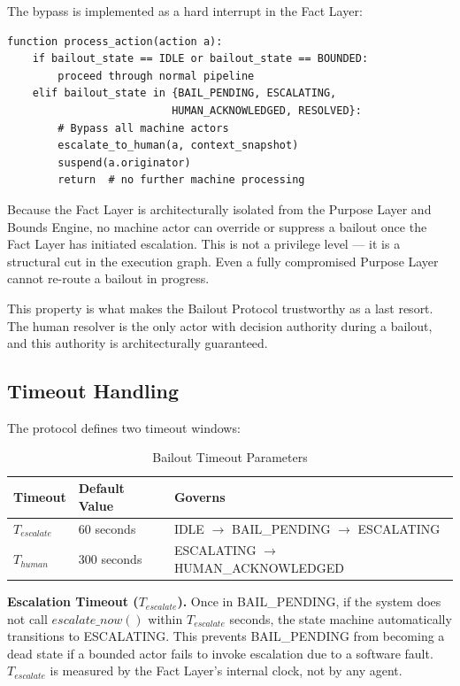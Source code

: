 The bypass is implemented as a hard interrupt in the Fact Layer:

\begin{verbatim}
function process_action(action a):
    if bailout_state == IDLE or bailout_state == BOUNDED:
        proceed through normal pipeline
    elif bailout_state in {BAIL_PENDING, ESCALATING,
                          HUMAN_ACKNOWLEDGED, RESOLVED}:
        # Bypass all machine actors
        escalate_to_human(a, context_snapshot)
        suspend(a.originator)
        return  # no further machine processing
\end{verbatim}

Because the Fact Layer is architecturally isolated from the Purpose Layer and Bounds Engine, no machine actor can override or suppress a bailout once the Fact Layer has initiated escalation. This is not a privilege level --- it is a structural cut in the execution graph. Even a fully compromised Purpose Layer cannot re-route a bailout in progress.

This property is what makes the Bailout Protocol trustworthy as a last resort. The human resolver is the only actor with decision authority during a bailout, and this authority is architecturally guaranteed.

\subsection{Timeout Handling}
\label{sec:timeouts}

The protocol defines two timeout windows:

\begin{table}[H]
\centering
\caption{Bailout Timeout Parameters}
\label{tab:timeouts}
\begin{tabular}{@{}lp{3cm}l@{}}
\toprule
\textbf{Timeout} & \textbf{Default Value} & \textbf{Governs} \\
\midrule
$T_{escalate}$ & 60 seconds & IDLE $\rightarrow$ BAIL\_PENDING $\rightarrow$ ESCALATING \\
$T_{human}$    & 300 seconds & ESCALATING $\rightarrow$ HUMAN\_ACKNOWLEDGED \\
\bottomrule
\end{tabular}
\end{table}

\medskip\noindent\textbf{Escalation Timeout ($T_{escalate}$).} Once in BAIL\_PENDING, if the system does not call $escalate\_now()$ within $T_{escalate}$ seconds, the state machine automatically transitions to ESCALATING. This prevents BAIL\_PENDING from becoming a dead state if a bounded actor fails to invoke escalation due to a software fault. $T_{escalate}$ is measured by the Fact Layer's internal clock, not by any agent.

